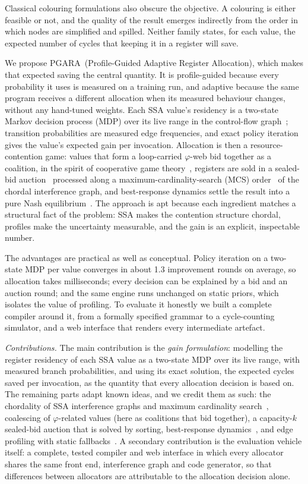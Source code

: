 \documentclass{ieeeaccess}
\newcommand{\MG}{PGARA}
\begin{document}
Classical colouring formulations also obscure the objective. A
colouring is either feasible or not, and the quality of the result
emerges indirectly from the order in which nodes are simplified and
spilled. Neither family states, for each value, the expected number of
cycles that keeping it in a register will save.

We propose \MG\ (Profile-Guided Adaptive Register Allocation), which
makes that expected saving the central quantity. It is profile-guided
because every probability it uses is measured on a training run, and
adaptive because the same program receives a different allocation when
its measured behaviour changes, without any hand-tuned weights.
Each SSA value's residency is a two-state Markov decision process (MDP)
over its live range in the control-flow graph~\cite{puterman1994,bertsekas2019};
transition probabilities are measured edge frequencies, and exact policy
iteration~\cite{howard1960} gives the value's expected gain per
invocation. Allocation is then a resource-contention game: values that
form a loop-carried $\varphi$-web bid together as a coalition, in the
spirit of cooperative game theory~\cite{shapley1953}, registers are sold
in a sealed-bid auction~\cite{vickrey1961} processed along a
maximum-cardinality-search (MCS) order~\cite{tarjan1984} of the chordal
interference graph, and best-response dynamics settle the result into a
pure Nash equilibrium~\cite{rosenthal1973,nisan2007agt}. The approach
is apt because each ingredient matches a structural fact of the problem:
SSA makes the contention structure chordal, profiles make the
uncertainty measurable, and the gain is an explicit, inspectable number.

The advantages are practical as well as conceptual. Policy iteration on
a two-state MDP per value converges in about 1.3 improvement rounds on
average, so allocation takes milliseconds; every decision can be
explained by a bid and an auction round; and the same engine runs
unchanged on static priors, which isolates the value of profiling.
To evaluate it honestly we built a complete compiler around it, from a
formally specified grammar to a cycle-counting simulator, and a web
interface that renders every intermediate artefact.

\textit{Contributions.} The main contribution is the \emph{gain
formulation}: modelling the register residency of each SSA value as a
two-state MDP over its live range, with measured branch probabilities,
and using its exact solution, the expected cycles saved per invocation,
as the quantity that every allocation decision is based on. The
remaining parts adapt known ideas, and we credit them as such: the
chordality of SSA interference graphs and maximum cardinality
search~\cite{hack2006ssa,tarjan1984}, coalescing of $\varphi$-related
values (here as coalitions that bid together), a capacity-$k$
sealed-bid auction that is solved by sorting, best-response
dynamics~\cite{nisan2007agt}, and edge profiling with static
fallbacks~\cite{wu1994}. A secondary contribution is the evaluation
vehicle itself: a complete, tested compiler and web interface in which
every allocator shares the same front end, interference graph and code
generator, so that differences between allocators are attributable to
the allocation decision alone.
\end{document}
